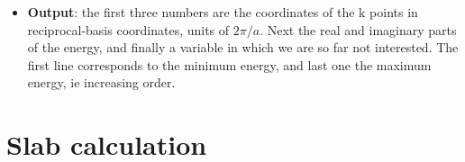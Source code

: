 \documentclass[a4paper,10pt,fullpage]{report}
\begin{document}
\begin{itemize}
\item \textbf{Output}: the first three numbers are the 
coordinates of the k points in reciprocal-basis coordinates,
units of $2\pi/a$. Next the real and imaginary parts of the energy, and finally
a variable in which we are so far not interested. 
The first line corresponds to the minimum energy, and last one
the maximum energy, ie increasing order. 
\end{itemize}




\section{Slab calculation}
\label{sec:slab}
\end{document}
